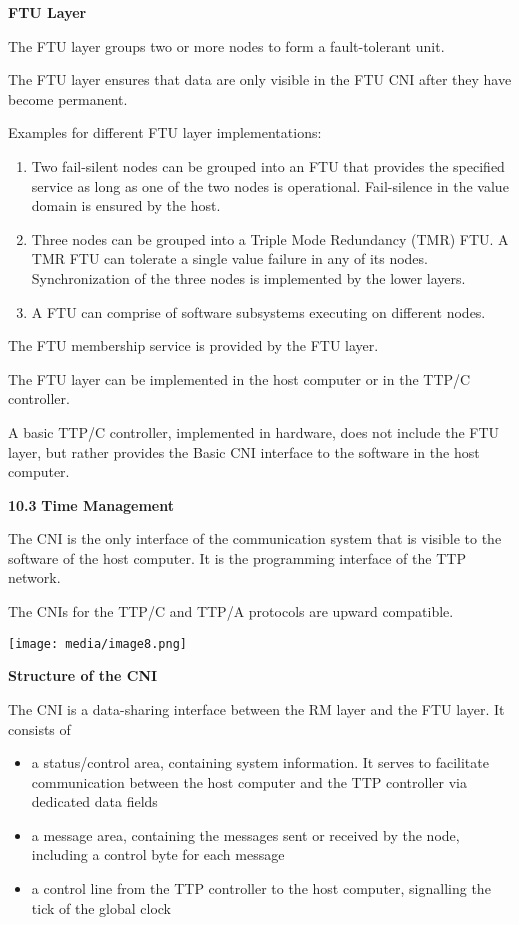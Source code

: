 \textbf{FTU Layer}

The FTU layer groups two or more nodes to form a fault-tolerant unit.

The FTU layer ensures that data are only visible in the FTU CNI after
they have become permanent.

Examples for different FTU layer implementations:

\begin{enumerate}
\def\labelenumi{\arabic{enumi}.}
\item
  Two fail-silent nodes can be grouped into an FTU that provides the
  specified service as long as one of the two nodes is operational.
  Fail-silence in the value domain is ensured by the host.
\item
  Three nodes can be grouped into a Triple Mode Redundancy (TMR) FTU. A
  TMR FTU can tolerate a single value failure in any of its nodes.
  Synchronization of the three nodes is implemented by the lower layers.
\item
  A FTU can comprise of software subsystems executing on different
  nodes.
\end{enumerate}

The FTU membership service is provided by the FTU layer.

The FTU layer can be implemented in the host computer or in the TTP/C
controller.

A basic TTP/C controller, implemented in hardware, does not include the
FTU layer, but rather provides the Basic CNI interface to the software
in the host computer.

\textbf{10.3} \protect\hypertarget{teil4}{}{}\textbf{Time Management }

The CNI is the only interface of the communication system that is
visible to the software of the host computer. It is the programming
interface of the TTP network.

The CNIs for the TTP/C and TTP/A protocols are upward compatible.

\texttt{[image: media/image8.png]}

\textbf{Structure of the CNI}

The CNI is a data-sharing interface between the RM layer and the FTU
layer. It consists of

\begin{itemize}
\item
  a status/control area, containing system information. It serves to
  facilitate communication between the host computer and the TTP
  controller via dedicated data fields
\item
  a message area, containing the messages sent or received by the node,
  including a control byte for each message
\item
  a control line from the TTP controller to the host computer,
  signalling the tick of the global clock
\end{itemize}

